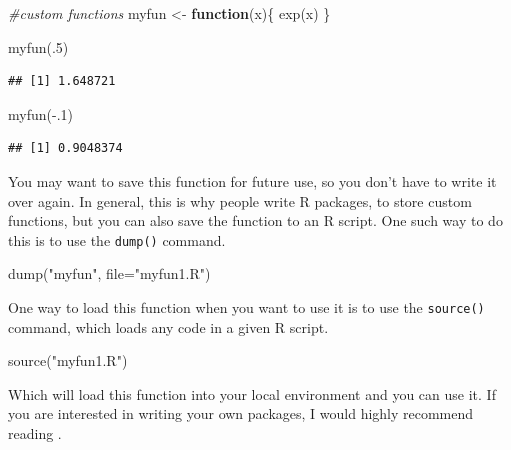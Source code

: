 \documentclass[
]{article}
\newenvironment{Shaded}{\begin{snugshade}}{\end{snugshade}}
\newcommand{\AttributeTok}[1]{\textcolor[rgb]{0.77,0.63,0.00}{#1}}
\newcommand{\CommentTok}[1]{\textcolor[rgb]{0.56,0.35,0.01}{\textit{#1}}}
\newcommand{\ControlFlowTok}[1]{\textcolor[rgb]{0.13,0.29,0.53}{\textbf{#1}}}
\newcommand{\DecValTok}[1]{\textcolor[rgb]{0.00,0.00,0.81}{#1}}
\newcommand{\FunctionTok}[1]{\textcolor[rgb]{0.00,0.00,0.00}{#1}}
\newcommand{\NormalTok}[1]{#1}
\newcommand{\OtherTok}[1]{\textcolor[rgb]{0.56,0.35,0.01}{#1}}
\newcommand{\SpecialCharTok}[1]{\textcolor[rgb]{0.00,0.00,0.00}{#1}}
\newcommand{\StringTok}[1]{\textcolor[rgb]{0.31,0.60,0.02}{#1}}
\begin{document}
\begin{Shaded}
\begin{Highlighting}[]
\CommentTok{\#custom functions}
\NormalTok{myfun }\OtherTok{\textless{}{-}} \ControlFlowTok{function}\NormalTok{(x)\{}
  \FunctionTok{exp}\NormalTok{(x)}
\NormalTok{\}}

\FunctionTok{myfun}\NormalTok{(.}\DecValTok{5}\NormalTok{)}
\end{Highlighting}
\end{Shaded}

\begin{verbatim}
## [1] 1.648721
\end{verbatim}

\begin{Shaded}
\begin{Highlighting}[]
\FunctionTok{myfun}\NormalTok{(}\SpecialCharTok{{-}}\NormalTok{.}\DecValTok{1}\NormalTok{)}
\end{Highlighting}
\end{Shaded}

\begin{verbatim}
## [1] 0.9048374
\end{verbatim}

You may want to save this function for future use, so you don't have to
write it over again. In general, this is why people write R packages, to
store custom functions, but you can also save the function to an R
script. One such way to do this is to use the \texttt{dump()} command.

\begin{Shaded}
\begin{Highlighting}[]
\FunctionTok{dump}\NormalTok{(}\StringTok{"myfun"}\NormalTok{, }
     \AttributeTok{file=}\StringTok{"myfun1.R"}\NormalTok{)}
\end{Highlighting}
\end{Shaded}

One way to load this function when you want to use it is to use the
\texttt{source()} command, which loads any code in a given R script.

\begin{Shaded}
\begin{Highlighting}[]
\FunctionTok{source}\NormalTok{(}\StringTok{"myfun1.R"}\NormalTok{)}
\end{Highlighting}
\end{Shaded}

Which will load this function into your local environment and you can
use it. If you are interested in writing your own packages, I would
highly recommend reading \citet{Wickham}.
\end{document}
